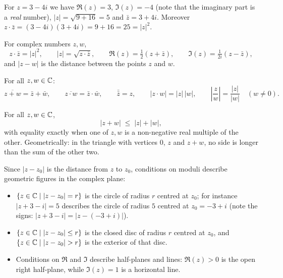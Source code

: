 \begin{example}
For $z = 3-4i$ we have $\Re(z) = 3$, $\Im(z) = -4$ (note that the imaginary part is a \emph{real} number),
$|z| = \sqrt{9+16} = 5$ and $\bar z = 3+4i$. Moreover
$z\cdot\bar z = (3-4i)(3+4i) = 9+16 = 25 = |z|^2$.
\end{example}

\begin{fact}[Properties]
For complex numbers $z,w$,
\[
z\cdot \bar{z} = |z|^2, \qquad |z| = \sqrt{z\cdot \bar{z}}, \qquad
\Re(z) = \tfrac12 (z+\bar{z}), \qquad \Im(z) = \tfrac{1}{2i} (z-\bar{z}),
\]
and $|z-w|$ is the distance between the points $z$ and $w$.
\end{fact}

\begin{fact}
For all $z,w\in\mathbb{C}$:
\[
\overline{z+w} = \bar z + \bar w, \qquad \overline{z\cdot w} = \bar z \cdot \bar w, \qquad \bar{\bar z} = z,
\qquad |z\cdot w| = |z|\,|w|, \qquad \left| \frac{z}{w} \right| = \frac{|z|}{|w|} \quad (w\neq 0).
\]
\end{fact}

\begin{fact}
For all $z,w\in\mathbb{C}$,
\[
|z+w| \;\leq\; |z| + |w|,
\]
with equality exactly when one of $z,w$ is a non-negative real multiple of the other. Geometrically: in the
triangle with vertices $0$, $z$ and $z+w$, no side is longer than the sum of the other two.
\end{fact}

\begin{example}
Since $|z-z_0|$ is the distance from $z$ to $z_0$, conditions on moduli describe geometric figures in the
complex plane:
\begin{itemize}
\item $\{z\in\mathbb{C} \mid |z-z_0| = r\}$ is the circle of radius $r$ centred at $z_0$; for instance
$|z+3-i| = 5$ describes the circle of radius $5$ centred at $z_0 = -3+i$ (note the signs:
$|z+3-i| = |z-(-3+i)|$).
\item $\{z\in\mathbb{C} \mid |z-z_0| \leq r\}$ is the closed disc of radius $r$ centred at $z_0$, and
$\{z\in\mathbb{C} \mid |z-z_0| > r\}$ is the exterior of that disc.
\item Conditions on $\Re$ and $\Im$ describe half-planes and lines: $\Re(z)>0$ is the open right
half-plane, while $\Im(z) = 1$ is a horizontal line.
\end{itemize}
\end{example}

